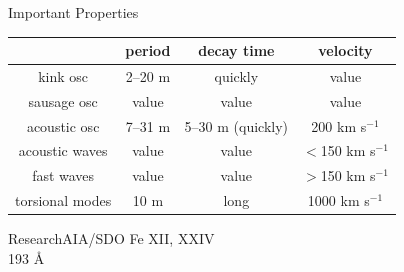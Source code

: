 \documentclass[11pt,table]{beamer}
\begin{document}
\begin{frame}{Important Properties}
\begin{center}
    \begin{tabular}{c|c|c|c|}
    \cline{2-4} & {\textbf{period}} &
        {\textbf{decay time}} &
        {\textbf{velocity}}\\
    \hline \multicolumn{0}{|c|}{kink osc} &
        2--20 m & quickly & value\\
    \hline \multicolumn{0}{|c|}{sausage osc} &
        value & value & value\\
    \hline \multicolumn{0}{|c|}{acoustic osc} &
        7--31 m & 5--30 m (quickly) & 200 km s$^{-1}$\\
    \hline \multicolumn{0}{|c|}{acoustic waves} &
        value & value & $<$150 km s$^{-1}$\\
    \hline \multicolumn{0}{|c|}{fast waves} &
        value & value & $>$150 km s$^{-1}$\\
    \hline \multicolumn{0}{|c|}{torsional modes} &
        10 m & long & 1000 km s$^{-1}$\\
    \hline
    \end{tabular}
\end{center}
\end{frame}%
{%
\begin{frame}[t]{Research}{AIA/SDO}
    \hspace{-2em}Fe {\footnotesize XII, XXIV}\\
    \hspace{-2em}193 \AA{}\\
\end{frame}}%
%
\end{document}
